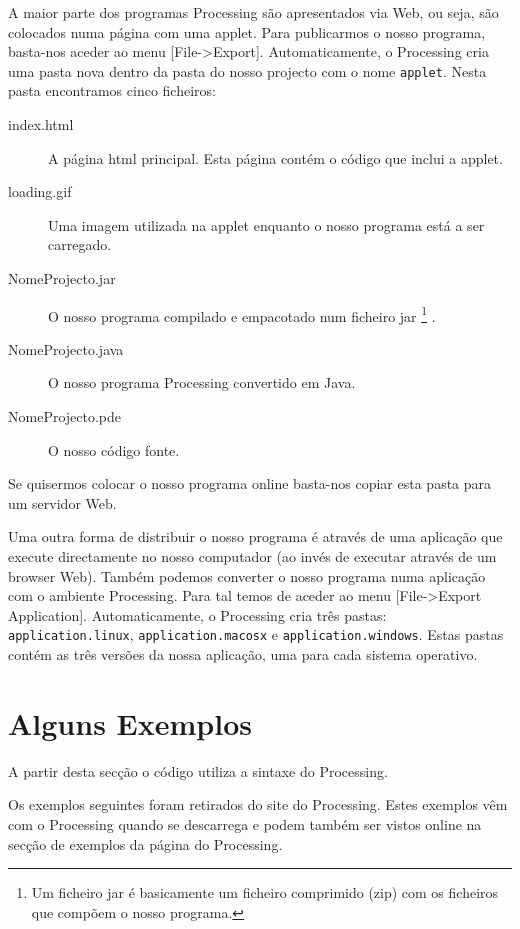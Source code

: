 A maior parte dos programas Processing são apresentados via Web, ou seja, são colocados numa página com uma applet. Para publicarmos o nosso programa, basta-nos aceder ao menu [File->Export]. Automaticamente, o Processing cria uma pasta nova dentro da pasta do nosso projecto com o nome \texttt{applet}. Nesta pasta encontramos cinco ficheiros:
\begin{description}
\item[index.html] A página html principal. Esta página contém o código que inclui a applet. 

\item[loading.gif] Uma imagem utilizada na applet enquanto o nosso programa está a ser carregado.

\item[NomeProjecto.jar] O nosso programa compilado e empacotado num ficheiro jar%
\footnote{Um ficheiro jar é basicamente um ficheiro comprimido (zip) com os ficheiros que compõem o nosso programa.}%
.

\item[NomeProjecto.java] O nosso programa Processing convertido em Java.

\item[NomeProjecto.pde] O nosso código fonte.
\end{description}

Se quisermos colocar o nosso programa online basta-nos copiar esta pasta para um servidor Web.

Uma outra forma de distribuir o nosso programa é através de uma aplicação que execute directamente no nosso computador (ao invés de executar através de um browser Web). Também podemos converter o nosso programa numa aplicação com o ambiente Processing. Para tal temos de aceder ao menu [File->Export Application]. Automaticamente, o Processing cria três pastas: \texttt{application.linux}, \texttt{application.macosx} e \texttt{application.windows}. Estas pastas contém as três versões da nossa aplicação, uma para cada sistema operativo.

\section{Alguns Exemplos}
\lstset{basicstyle=\scriptsize\ttfamily}

A partir desta secção o código utiliza a sintaxe do Processing.

Os exemplos seguintes foram retirados do site do Processing. 
Estes exemplos vêm com o Processing quando se descarrega e podem também ser vistos online na secção de exemplos da página do Processing.

